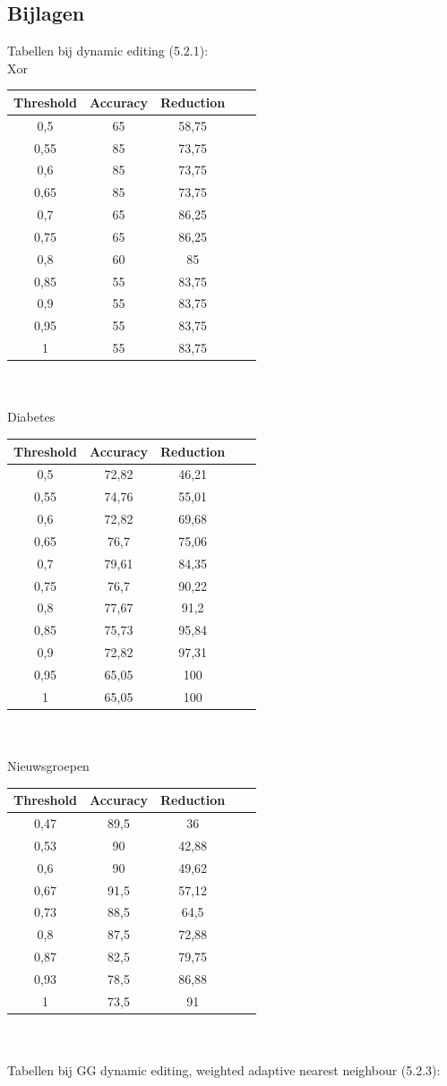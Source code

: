 \documentclass{article}
\begin{document}
\subsection{Bijlagen}
Tabellen bij dynamic editing (5.2.1):\\
Xor\\
\begin{tabular}{|c|c|c|c|c|}  \hline			
Threshold	& Accuracy &	Reduction \\ \hline
0,5 &	65 &	58,75 \\
0,55 &	85 &	73,75 \\
0,6 &	85 &	73,75 \\
0,65 &	85 &	73,75 \\
0,7 &	65 &	86,25 \\
0,75 &	65 &	86,25 \\
0,8 &	60 &	85 \\
0,85 &	55 &	83,75 \\
0,9 &	55 &	83,75 \\
0,95 &	55 &	83,75 \\
1 &	55 &	83,75 \\ \hline
\end{tabular} \\
\\
Diabetes\\
\begin{tabular}{|c|c|c|c|c|}  \hline			
Threshold	& Accuracy &	Reduction \\ \hline
0,5 &	72,82 &	46,21 \\
0,55 &	74,76 &	55,01 \\
0,6 &	72,82 &	69,68 \\
0,65 &	76,7 &	75,06 \\
0,7 &	79,61 &	84,35 \\
0,75 &	76,7 &	90,22 \\
0,8 &	77,67 &	91,2 \\
0,85 &	75,73 &	95,84 \\
0,9 &	72,82 &	97,31 \\
0,95 &	65,05 &	100 \\
1 &	65,05 &	100 \\ \hline
\end{tabular} \\
\\
Nieuwsgroepen\\
\begin{tabular}{|c|c|c|c|c|}  \hline			
Threshold	& Accuracy &	Reduction \\ \hline
0,47 &	89,5 &	36 \\
0,53 &	90 &	42,88 \\
0,6 &	90 &	49,62 \\
0,67 &	91,5 &	57,12 \\
0,73 &	88,5 &	64,5 \\
0,8 &	87,5 &	72,88 \\
0,87 &	82,5 &	79,75 \\
0,93 &	78,5 &	86,88 \\
1 &	73,5 &	91 \\ \hline
\end{tabular} \\
\\
Tabellen bij GG dynamic editing, weighted adaptive nearest neighbour (5.2.3):
\end{document}
